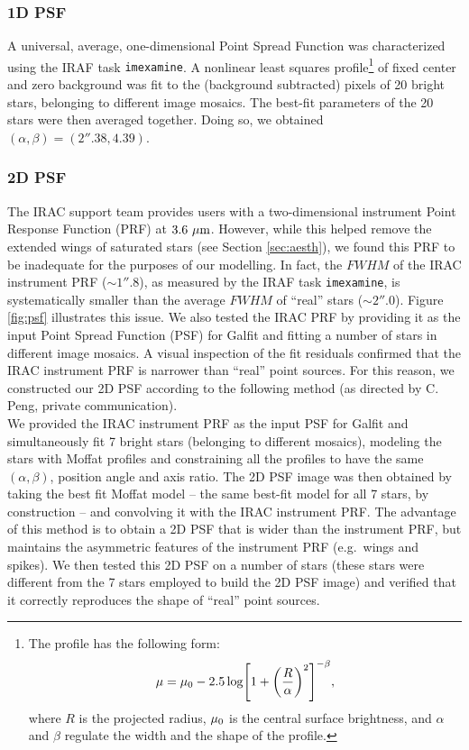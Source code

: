 \documentclass[preprint2]{emulateapj}
\begin{document}
\subsubsection{1D PSF}
A universal, average, one-dimensional Point Spread Function was characterized using the IRAF task {\tt imexamine}.
A nonlinear least squares \citep{moffat1969} profile\footnote{The \citep{moffat1969} profile 
has the following form:
\begin{equation}
\mu = \mu_{\rm 0} - 2.5 \log \Biggl[ 1 + \biggl( \frac{R}{\alpha} \biggr)^2 \Biggr]^{-\beta} ,
\end{equation}
where $R$ is the projected radius, $\mu_{\rm 0}$ is the central surface brightness, and 
$\alpha$ and $\beta$ regulate the width and the shape of the profile.} 
of fixed center and zero background was fit to the 
(background subtracted) pixels of 20 bright stars, belonging to different image mosaics.
The best-fit parameters of the 20 stars were then averaged together. 
Doing so, we obtained %
$(\alpha, \beta) = (2''.38, 4.39)$.

\subsubsection{2D PSF}
The IRAC support team provides users with a two-dimensional instrument Point Response Function (PRF) at $3.6~\rm \mu m$.
However, while this helped remove the extended wings of saturated stars (see Section \ref{sec:aesth}), 
we found this PRF to be inadequate for the purposes of our modelling.
In fact, the $FWHM$ of the IRAC instrument PRF ($\sim 1''.8$), as measured by the IRAF task {\tt imexamine}, 
is systematically smaller than the average $FWHM$ of ``real'' stars ($\sim 2''.0$). 
Figure \ref{fig:psf} illustrates this issue.
We also tested the IRAC PRF by providing it as the input Point Spread Function (PSF) for Galfit 
and fitting a number of stars in different image mosaics.
A visual inspection of the fit residuals confirmed that the IRAC instrument PRF is narrower than ``real'' point sources.
For this reason, we constructed our 2D PSF according to the following method 
(as directed by C. Peng, private communication).\\
We provided the IRAC instrument PRF as the input PSF for Galfit 
and simultaneously fit 7 bright stars (belonging to different mosaics), 
modeling the stars with Moffat profiles 
and constraining all the profiles to have the same $(\alpha, \beta)$, position angle and axis ratio.
The 2D PSF image was then obtained by taking the best fit Moffat model -- the same best-fit model for all 7 stars, by construction -- 
and convolving it with the IRAC instrument PRF.
The advantage of this method is to obtain a 2D PSF that is wider than the instrument PRF, 
but maintains the asymmetric features of the instrument PRF (e.g.~wings and spikes).
We then tested this 2D PSF 
on a number of stars (these stars were different from the 7 stars employed to build the 2D PSF image)
and verified that it correctly reproduces the shape of ``real'' point sources. 
\end{document}
